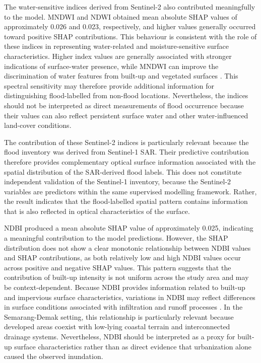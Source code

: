 \documentclass[11pt,twoside]{article}
\begin{document}
The water-sensitive indices derived from Sentinel-2 also contributed meaningfully to the model. MNDWI and NDWI obtained mean absolute SHAP values of approximately 0.026 and 0.023, respectively, and higher values generally occurred toward positive SHAP contributions. This behaviour is consistent with the role of these indices in representing water-related and moisture-sensitive surface characteristics. Higher index values are generally associated with stronger indications of surface-water presence, while MNDWI can improve the discrimination of water features from built-up and vegetated surfaces \cite{Bhatt2026}. This spectral sensitivity may therefore provide additional information for distinguishing flood-labelled from non-flood locations. Nevertheless, the indices should not be interpreted as direct measurements of flood occurrence because their values can also reflect persistent surface water and other water-influenced land-cover conditions.

The contribution of these Sentinel-2 indices is particularly relevant because the flood inventory was derived from Sentinel-1 SAR. Their predictive contribution therefore provides complementary optical surface information associated with the spatial distribution of the SAR-derived flood labels. This does not constitute independent validation of the Sentinel-1 inventory, because the Sentinel-2 variables are predictors within the same supervised modelling framework. Rather, the result indicates that the flood-labelled spatial pattern contains information that is also reflected in optical characteristics of the surface.

NDBI produced a mean absolute SHAP value of approximately 0.025, indicating a meaningful contribution to the model predictions. However, the SHAP distribution does not show a clear monotonic relationship between NDBI values and SHAP contributions, as both relatively low and high NDBI values occur across positive and negative SHAP values. This pattern suggests that the contribution of built-up intensity is not uniform across the study area and may be context-dependent. Because NDBI provides information related to built-up and impervious surface characteristics, variations in NDBI may reflect differences in surface conditions associated with infiltration and runoff processes \cite{Kebede2022, Shukuru2024}. In the Semarang-Demak setting, this relationship is particularly relevant because developed areas coexist with low-lying coastal terrain and interconnected drainage systems. Nevertheless, NDBI should be interpreted as a proxy for built-up surface characteristics rather than as direct evidence that urbanization alone caused the observed inundation.
\end{document}
